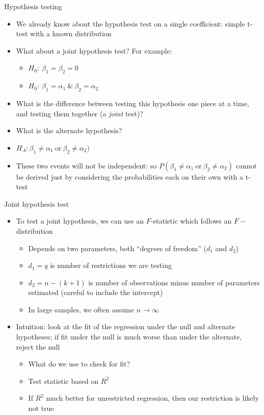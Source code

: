 \documentclass[aspectratio=169]{beamer}
\begin{document}
\begin{frame}{Hypothesis testing}
    \begin{itemize}
        \item We already know about the hypothesis test on a single coefficient: simple t-test with a known distribution
        \item What about a joint hypothesis test? For example:
        \begin{itemize}
            \item $H_0:~\beta_1 = \beta_2 = 0$
            \item $H_0:~\beta_1 = \alpha_1~\&~\beta_2 = \alpha_2$
        \end{itemize}
        \item What is the difference between testing this hypothesis one piece at a time, and testing them together (a \textit{joint} test)?
        \item What is the alternate hypothesis?

        \pause
        \item $H_A: \beta_1 \neq \alpha_1~ \text{or} ~\beta_2 \neq \alpha_2)$
        \item These two events will not be independent: so $P(\beta_1 \neq \alpha_1~ \text{or} ~\beta_2 \neq \alpha_2) $ cannot be derived just by considering the probabilities each on their own with a t-test
    \end{itemize}
\end{frame}

\begin{frame}{Joint hypothesis test}
    \begin{itemize}
        \item To test a joint hypothesis, we can use an $F$-statistic which follows an $F-$distribution
        \begin{itemize}
            \item Depends on two parameters, both ``degrees of freedom'' ($d_1$ and $d_2$)
            \item $d_1=q$ is number of restrictions we are testing
            \item $d_2=n-(k+1)$ is number of observations minus number of parameters estimated (careful to include the intercept)
            \item In large samples, we often assume $n \rightarrow \infty $
        \end{itemize}
        \item Intuition: look at the fit of the regression under the null and alternate hypotheses; if fit under the null is much worse than under the alternate, reject the null
        \begin{itemize}
            \item What do we use to check for fit?
            \pause
            \item Test statistic based on $R^2$
            \item If $R^2$ much better for unrestricted regression, then our restriction is likely not true
        \end{itemize}
    \end{itemize}
\end{frame}
\end{document}
